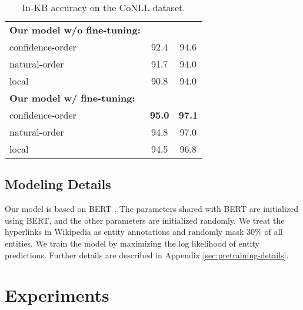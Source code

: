 \documentclass[11pt]{article}
\begin{document}
\begin{table}[t]
{\begin{tabular}{l|c|c}
      \hline
      \textbf{Our model w/o fine-tuning:}                     &                    &               \\
      \hspace{2mm}confidence-order                            & 92.4               & 94.6          \\
      \hspace{2mm}natural-order                               & 91.7               & 94.0          \\
      \hspace{2mm}local                                       & 90.8               & 94.0          \\
      \hline
      \textbf{Our model w/ fine-tuning:}                      &                    &               \\
      \hspace{2mm}confidence-order                            & \textbf{95.0}      & \textbf{97.1} \\
      \hspace{2mm}natural-order                               & 94.8               & 97.0          \\
      \hspace{2mm}local                                       & 94.5               & 96.8          \\
      \hline
    \end{tabular}
  }
  \caption{In-KB accuracy on the CoNLL dataset.}
  \label{tb:conll-results}

\end{table}
\subsection{Modeling Details}
\label{subsec:training}

Our model is based on BERT \cite{devlin2018bert}.
The parameters shared with BERT are initialized using BERT, and the other parameters are initialized randomly.
We treat the hyperlinks in Wikipedia as entity annotations and randomly mask 30\% of all entities.
We train the model by maximizing the log likelihood of entity predictions.
Further details are described in Appendix \ref{sec:pretraining-details}.

\section{Experiments}
\label{subsec:experimental-setup}
\end{document}

